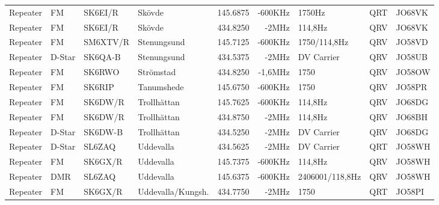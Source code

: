\begin{landscape}
\begin{longtable}{llllrrlcl}
	Repeater          & FM           & SK6EI/R       & Skövde              &          145.6875 &        -600KHz & 1750Hz          &       QRT       & JO68VK           \\
	Repeater          & FM           & SK6EI/R       & Skövde              &          434.8250 &          -2MHz & 114,8Hz         &       QRV       & JO68VK           \\
	Repeater          & FM           & SM6XTV/R      & Stenungsund         &          145.7125 &        -600KHz & 1750/114,8Hz    &       QRV       & JO58VD           \\
	Repeater          & D-Star       & SK6QA-B       & Stenungsund         &          434.5375 &          -2MHz & DV Carrier      &       QRV       & JO58UB           \\
	Repeater          & FM           & SK6RWO        & Strömstad           &          434.8250 &        -1,6MHz & 1750            &       QRV       & JO58OW           \\
	Repeater          & FM           & SK6RIP        & Tanumshede          &          145.6750 &        -600KHz & 1750            &       QRV       & JO58PR           \\
	Repeater          & FM           & SK6DW/R       & Trollhättan         &          145.7625 &        -600KHz & 114,8Hz         &       QRV       & JO68DG           \\
	Repeater          & FM           & SK6DW/R       & Trollhättan         &          434.8750 &          -2MHz & 114,8Hz         &       QRV       & JO68BH           \\
	Repeater          & D-Star       & SK6DW-B       & Trollhättan         &          434.5250 &          -2MHz & DV Carrier      &       QRV       & JO68DG           \\
	Repeater          & D-Star       & SL6ZAQ        & Uddevalla           &          434.5625 &          -2MHz & DV Carrier      &       QRT       & JO58WH           \\
	Repeater          & FM           & SK6GX/R       & Uddevalla           &          145.7375 &        -600KHz & 114,8Hz         &       QRV       & JO58WH           \\
	Repeater          & DMR          & SL6ZAQ        & Uddevalla           &          145.6375 &        -600KHz & 2406001/118,8Hz &       QRV       & JO58WH           \\
	Repeater          & FM           & SK6GX/R       & Uddevalla/Kungsh.   &          434.7750 &          -2MHz & 1750            &       QRT       & JO58PI           \\

\end{longtable}
\end{landscape}
